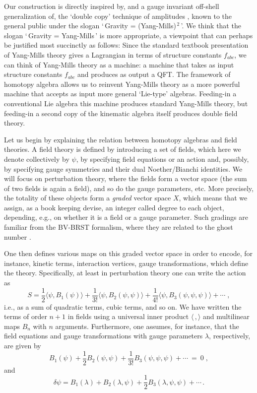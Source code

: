 \documentclass[12pt]{article}\pdfoutput=1
\def\be{\begin{equation}}
\def\ee{\end{equation}}
\begin{document}
Our construction is directly inspired by, and a gauge invariant off-shell generalization of, 
the `double copy' technique of  amplitudes \cite{Kawai:1985xq,Bern:2008qj,Bern:2019prr}, 
known to the general public under the slogan `\,Gravity = (Yang-Mills)$^{\,2}$\,'.  
We think 
that the slogan  `\,Gravity = Yang-Mills\,' is more appropriate,  
a viewpoint that can perhaps be justified  most  succinctly as follows: 
Since the standard textbook presentation of Yang-Mills theory gives a Lagrangian in terms of structure constants $f_{abc}$, 
we can  think of Yang-Mills theory as a machine: a machine that takes as input structure constants $f_{abc}$  
and produces as output a QFT. The framework of homotopy algebra allows us to reinvent Yang-Mills theory as a more powerful machine that accepts as input more general `Lie-type' algebras. Feeding-in a conventional Lie algebra this machine produces  standard Yang-Mills theory, but feeding-in a second copy of the kinematic algebra itself produces 
double field theory.

\medskip

Let us begin by explaining the relation between homotopy algebras and field theories. A field theory is defined 
by introducing a set of fields, which here we denote collectively by $\psi$, by specifying field equations or an action and, possibly, by 
specifying gauge symmetries and  their dual Noether/Bianchi identities.  
We will focus on perturbation theory, where the fields form a vector space (the sum of two fields is again a field), 
and so do the gauge parameters, etc. More precisely, the totality of these objects form a \textit{graded} vector space $X$, 
which means that we assign, as a book keeping devise, an integer called degree to each object, depending, e.g.,  on whether it is a field or 
a gauge parameter.  
Such gradings are familiar from the BV-BRST formalism, where they are related to the ghost number \cite{Batalin:1981jr,Henneaux:1989jq}. 

One then defines various maps on this graded vector space in order to encode, for instance,  kinetic terms, interaction vertices, gauge transformations, 
which define the theory. Specifically, at least in perturbation theory one can write the action as 
\begin{equation}\label{firstLinftyAction}
  S  = \frac{1}{2} \big\langle \psi , B_1(\psi)\big\rangle  + \frac{1}{3!} \big\langle \psi, B_2(\psi,\psi)\big\rangle 
  +\frac{1}{4!} \big\langle \psi, B_3(\psi,\psi,\psi)\big \rangle +\cdots\;, 
 \end{equation} 
i.e., as a sum of quadratic terms, cubic terms, and so on. We have written the terms of order $n+1$ in  fields using  a universal 
inner product $\langle\,,\rangle$ and multilinear maps $B_n$ with $n$ arguments. Furthermore, one assumes, for instance,  
that the field equations and gauge transformations with  gauge parameters $\lambda$, respectively, are given by 
 \be\label{EOM}
  B_1(\psi)  +\frac{1}{2} B_2(\psi,\psi)  +\frac{1}{3!} B_{3}(\psi,\psi,\psi)+\cdots \ = \ 0 \;, 
 \ee
and 
 \be\label{deltaPsi} 
  \delta\psi = B_1(\lambda) + B_2(\lambda,\psi) + \frac{1}{2} B_3(\lambda, \psi,\psi)  +\cdots\,. 
 \ee
\end{document}

